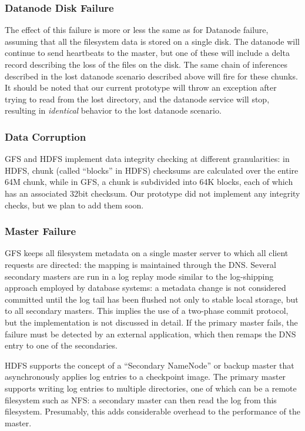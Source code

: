 \documentclass{article}
\begin{document}
\subsubsection{Datanode Disk Failure}
The effect of this failure is more or less the same as for Datanode
failure, assuming that all the filesystem data is stored on a single
disk.  The datanode will continue to send heartbeats to the master,
but one of these will include a delta record describing the loss of
the files on the disk.  The same chain of inferences described in the
lost datanode scenario described above will fire for these chunks.  It
should be noted that our current prototype will throw an exception
after trying to read from the lost directory, and the datanode service
will stop, resulting in \emph{identical} behavior to the lost datanode
scenario.

\subsubsection{Data Corruption}
GFS and HDFS implement data integrity checking at different
granularities: in HDFS, chunk (called ``blocks'' in HDFS) checksums
are calculated over the entire 64M chunk, while in GFS, a chunk is
subdivided into 64K blocks, each of which has an associated 32bit
checksum.  Our prototype did not implement any integrity checks, but
we plan to add them soon.

\subsubsection{Master Failure}
GFS keeps all filesystem metadata on a single master server to which
all client requests are directed: the mapping is maintained through
the DNS.  Several secondary masters are run in a log replay mode
similar to the log-shipping approach employed by database systems: a
metadata change is not considered committed until the log tail has
been flushed not only to stable local storage, but to all secondary
masters.  This implies the use of a two-phase commit protocol, but the
implementation is not discussed in detail.  If the primary master
fails, the failure must be detected by an external application, which
then remaps the DNS entry to one of the secondaries.
 
HDFS supports the concept of a ``Secondary NameNode'' or backup master
that asynchronously applies log entries to a checkpoint image.  The
primary master supports writing log entries to multiple directories,
one of which can be a remote filesystem such as NFS: a secondary
master can then read the log from this filesystem.  Presumably, this
adds considerable overhead to the performance of the master.
 
\end{document}

